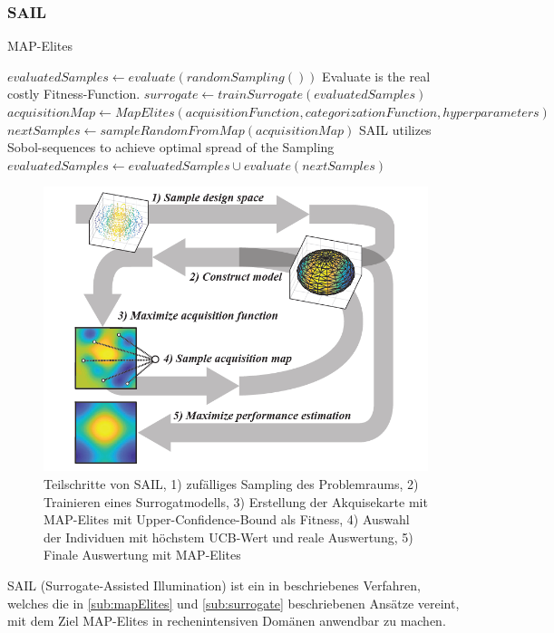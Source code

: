 \subsubsection{SAIL}

\begin{algorithm}
	\caption{MAP-Elites} \label{alg:mapElites}
	\begin{algorithmic}[1]
\State $evaluatedSamples \gets evaluate(randomSampling())$ \Comment Evaluate is the real costly Fitness-Function.
\Else
\State $surrogate \gets trainSurrogate(evaluatedSamples)$
\State $acquisitionMap \gets MapElites(acquisitionFunction,categorizationFunction,hyperparameters)$
\State $nextSamples \gets sampleRandomFromMap(acquisitionMap)$ \Comment SAIL utilizes Sobol-sequences to achieve optimal spread of the Sampling
\State $evaluatedSamples \gets evaluatedSamples \cup evaluate(nextSamples)$
\EndIf
			\EndWhile
		\EndProcedure
	\end{algorithmic}
\end{algorithm}

\begin{figure}[h]
	\centering
	\includegraphics[width=.7\linewidth]{bilder/sail}
	\caption{Teilschritte von SAIL, 
		1) zufälliges Sampling des Problemraums, 
		2) Trainieren eines Surrogatmodells, 
		3) Erstellung der Akquisekarte mit MAP-Elites mit Upper-Confidence-Bound als Fitness, 
		4) Auswahl der Individuen mit höchstem UCB-Wert und reale Auswertung,
		5) Finale Auswertung mit MAP-Elites
	}
	\label{fig:sail}
\end{figure}

SAIL (Surrogate-Assisted Illumination) ist ein in \cite{Gaier.6152018} beschriebenes Verfahren, welches die in \ref{sub:mapElites} und \ref{sub:surrogate} beschriebenen Ansätze vereint, mit dem Ziel MAP-Elites in rechenintensiven Domänen anwendbar zu machen.

